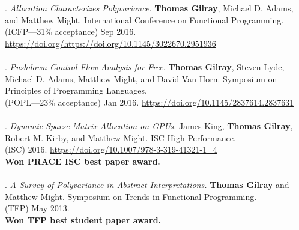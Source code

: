 \paper. \textit{Allocation Characterizes Polyvariance.}
\textbf{Thomas Gilray}, Michael D. Adams, and Matthew Might.
International Conference on Functional Programming.
\\(ICFP---31\% acceptance) Sep 2016. \url{https://doi.org/https://doi.org/10.1145/3022670.2951936}
\\ \vspace{-0.1cm}\\
\paper. \textit{Pushdown Control-Flow Analysis for Free.}
\textbf{Thomas Gilray}, Steven Lyde, Michael D. Adams, Matthew Might, and David Van Horn.
Symposium on Principles of Programming Languages.
\\(POPL---23\% acceptance) Jan 2016. \url{https://doi.org/10.1145/2837614.2837631}
\\ \vspace{-0.1cm}\\
\paper. \textit{Dynamic Sparse-Matrix Allocation on GPUs.}
James King, \textbf{Thomas Gilray}, Robert M. Kirby, and Matthew Might.
ISC High Performance.
\\(ISC) 2016. \url{https://doi.org/10.1007/978-3-319-41321-1_4}
\\\textbf{Won PRACE ISC best paper award.} \\ \vspace{-0.1cm}\\
\paper. \textit{A Survey of Polyvariance in Abstract Interpretations.}
\textbf{Thomas Gilray} and Matthew Might.
Symposium on Trends in Functional Programming.
\\(TFP) May 2013.
\\\textbf{Won TFP best student paper award.} \\ \vspace{-0.1cm}\\
